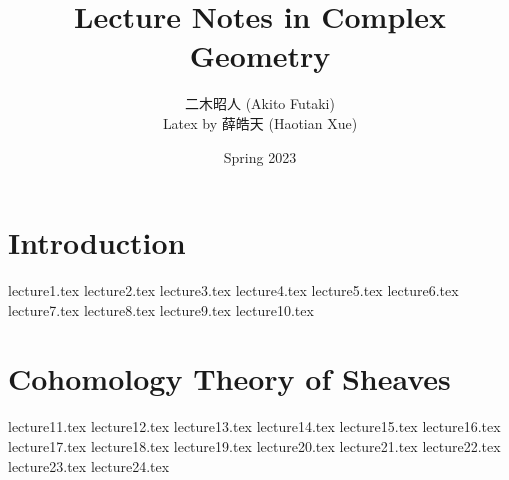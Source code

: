 \documentclass[twoside,12pt]{book}
\title{\Huge Lecture Notes in Complex Geometry}
\author{{\Large 二木昭人} (Akito Futaki)\\
Latex by 薛皓天 (Haotian Xue)}
\date{\Large Spring 2023}
\begin{document}
\maketitle
\frontmatter
\tableofcontents
\newpage
\mainmatter{}

\chapter{Introduction}
{lecture1.tex}
{lecture2.tex}
{lecture3.tex}
{lecture4.tex}
{lecture5.tex}
{lecture6.tex}
{lecture7.tex}
{lecture8.tex}
{lecture9.tex}
{lecture10.tex}
\chapter{Cohomology Theory of Sheaves}
{lecture11.tex}
{lecture12.tex}
{lecture13.tex}
{lecture14.tex}
{lecture15.tex}
{lecture16.tex}
{lecture17.tex}
{lecture18.tex}
{lecture19.tex}
{lecture20.tex}
{lecture21.tex}
{lecture22.tex}
{lecture23.tex}
{lecture24.tex}
\end{document}
